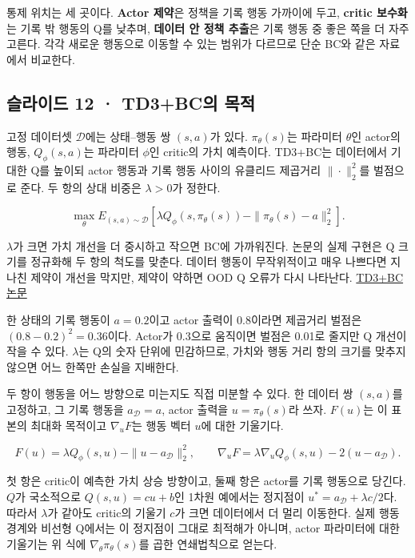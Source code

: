 \documentclass[11pt,a4paper]{article}
\begin{document}
통제 위치는 세 곳이다. \textbf{Actor 제약}은 정책을 기록 행동 가까이에 두고, \textbf{critic 보수화}는 기록 밖 행동의 Q를 낮추며, \textbf{데이터 안 정책 추출}은 기록 행동 중 좋은 쪽을 더 자주 고른다. 각각 새로운 행동으로 이동할 수 있는 범위가 다르므로 단순 BC와 같은 자료에서 비교한다.\par

\subsection{슬라이드 12 · TD3+BC의 목적}

고정 데이터셋 $\mathcal D$에는 상태–행동 쌍 $(s,a)$가 있다. $\pi_\theta(s)$는 파라미터 $\theta$인 actor의 행동, $Q_\phi(s,a)$는 파라미터 $\phi$인 critic의 가치 예측이다. TD3+BC는 데이터에서 기대한 Q를 높이되 actor 행동과 기록 행동 사이의 유클리드 제곱거리 $\|\cdot\|_2^2$를 벌점으로 준다. 두 항의 상대 비중은 $\lambda>0$가 정한다.\par

\[
\max_\theta E_{(s,a)\sim\mathcal D}
\left[\lambda Q_\phi(s,\pi_\theta(s))
-\|\pi_\theta(s)-a\|_2^2\right].
\]

$\lambda$가 크면 가치 개선을 더 중시하고 작으면 BC에 가까워진다. 논문의 실제 구현은 Q 크기를 정규화해 두 항의 척도를 맞춘다. 데이터 행동이 무작위적이고 매우 나쁘다면 지나친 제약이 개선을 막지만, 제약이 약하면 OOD Q 오류가 다시 나타난다. \href{https://arxiv.org/abs/2106.06860}{TD3+BC 논문}\par

한 상태의 기록 행동이 $a=0.2$이고 actor 출력이 0.8이라면 제곱거리 벌점은 $(0.8-0.2)^2=0.36$이다. Actor가 0.3으로 움직이면 벌점은 0.01로 줄지만 Q 개선이 작을 수 있다. $\lambda$는 Q의 숫자 단위에 민감하므로, 가치와 행동 거리 항의 크기를 맞추지 않으면 어느 한쪽만 손실을 지배한다.\par

두 항이 행동을 어느 방향으로 미는지도 직접 미분할 수 있다. 한 데이터 쌍 $(s,a)$를 고정하고, 그 기록 행동을 $a_{\mathcal D}=a$, actor 출력을 $u=\pi_\theta(s)$라 쓰자. $F(u)$는 이 표본의 최대화 목적이고 $\nabla_uF$는 행동 벡터 $u$에 대한 기울기다.\par

\[
F(u)=\lambda Q_\phi(s,u)-\|u-a_{\mathcal D}\|_2^2,
\qquad
\nabla_uF=\lambda\nabla_uQ_\phi(s,u)-2(u-a_{\mathcal D}).
\]

첫 항은 critic이 예측한 가치 상승 방향이고, 둘째 항은 actor를 기록 행동으로 당긴다. $Q$가 국소적으로 $Q(s,u)=cu+b$인 1차원 예에서는 정지점이 $u^*=a_{\mathcal D}+\lambda c/2$다. 따라서 $\lambda$가 같아도 critic의 기울기 $c$가 크면 데이터에서 더 멀리 이동한다. 실제 행동 경계와 비선형 Q에서는 이 정지점이 그대로 최적해가 아니며, actor 파라미터에 대한 기울기는 위 식에 $\nabla_\theta\pi_\theta(s)$를 곱한 연쇄법칙으로 얻는다.\par
\end{document}
